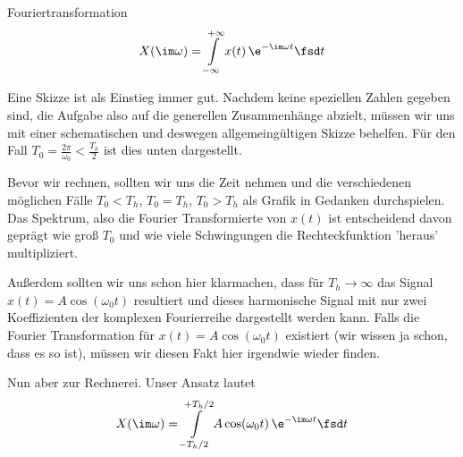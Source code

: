 \begin{Werkzeug}
Fouriertransformation
\begin{align}
X(\im \omega) = \int\limits_{-\infty}^{+\infty} x(t) \, \e^{-\im \omega t} \fsd t
\end{align}
\end{Werkzeug}
\begin{Ansatz}
Eine Skizze ist als Einstieg immer gut. Nachdem keine speziellen Zahlen gegeben sind,
die Aufgabe also auf die generellen Zusammenhänge abzielt, müssen wir uns mit einer
schematischen und deswegen allgemeingültigen Skizze behelfen. Für den Fall
$T_0=\frac{2\pi}{\omega_0}< \frac{T_h}{2}$ ist dies unten dargestellt.
%
\begin{center}
\end{center}
%
Bevor wir rechnen, sollten wir uns die Zeit nehmen und die verschiedenen
möglichen Fälle
$T_0<T_h$, $T_0=T_h$, $T_0>T_h$ als Grafik in Gedanken durchspielen.
Das Spektrum, also die Fourier Transformierte von $x(t)$ ist entscheidend davon
geprägt wie groß $T_0$ und wie viele Schwingungen die Rechteckfunktion 'heraus'
multipliziert.

Außerdem sollten wir uns schon hier klarmachen, dass für $T_h\to\infty$ das Signal
$x(t) = A \cos(\omega_0 t)$ resultiert und dieses harmonische Signal
mit nur zwei Koeffizienten der komplexen Fourierreihe dargestellt werden
kann.
%
Falls die Fourier Transformation für $x(t) = A \cos(\omega_0 t)$ existiert
(wir wissen ja schon, dass es so ist), müssen wir diesen Fakt hier
irgendwie wieder finden.

Nun aber zur Rechnerei.
%
Unser Ansatz lautet
\begin{align}
X(\im \omega) = \int\limits_{-T_h/2}^{+T_h/2} A \cos(\omega_0 t) \, \e^{-\im \omega t} \fsd t
\end{align}
\end{Ansatz}
